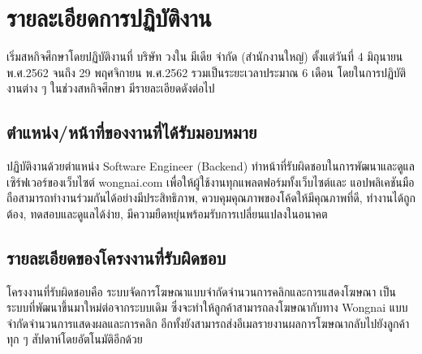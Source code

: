 \chapter{รายละเอียดการปฏิบัติงาน}
\label{chapter:related-theory}

เริ่มสหกิจศึกษาโดยปฏิบัติงานที่ บริษัท วงใน มีเดีย จำกัด (สำนักงานใหญ่) ตั้งแต่วันที่ 4 มิถุนายน พ.ศ.2562 จนถึง 29 พฤศจิกายน พ.ศ.2562 รวมเป็นระยะเวลาประมาณ 6 เดือน โดยในการปฏิบัติงานต่าง ๆ ในช่วงสหกิจศึกษา มีรายละเอียดดังต่อไป

\section{ตำแหน่ง/หน้าที่ของงานที่ได้รับมอบหมาย}
ปฏิบัติงานด้วยตำแหน่ง Software Engineer (Backend) ทำหน้าที่รับผิดชอบในการพัฒนาและดูแลเซิร์ฟเวอร์ของเว็บไซต์ wongnai.com เพื่อให้ผู้ใช้งานทุกแพลตฟอร์มทั้งเว็บไซต์และ แอปพลิเคชันมือถือสามารถทำงานร่วมกันได้อย่างมีประสิทธิภาพ, ควบคุมคุณภาพของโค้ดให้มีคุณภาพที่ดี, ทำงานได้ถูกต้อง, ทดสอบและดูแลได้ง่าย, มีความยืดหยุ่นพร้อมรับการเปลี่ยนแปลงในอนาคต

\section{รายละเอียดของโครงงานที่รับผิดชอบ}
โครงงานที่รับผิดชอบคือ ระบบจัดการโฆษณาแบบจำกัดจำนวนการคลิกและการแสดงโฆษณา เป็นระบบที่พัฒนาขึ้นมาใหม่ต่อจากระบบเดิม ซึ่งจะทำให้ลูกค้าสามารถลงโฆษณากับทาง Wongnai แบบจำกัดจำนวนการแสดงผลและการคลิก อีกทั้งยังสามารถส่งอีเมลรายงานผลการโฆษณากลับไปยังลูกค้าทุก ๆ สัปดาห์โดยอัตโนมัติอีกด้วย

